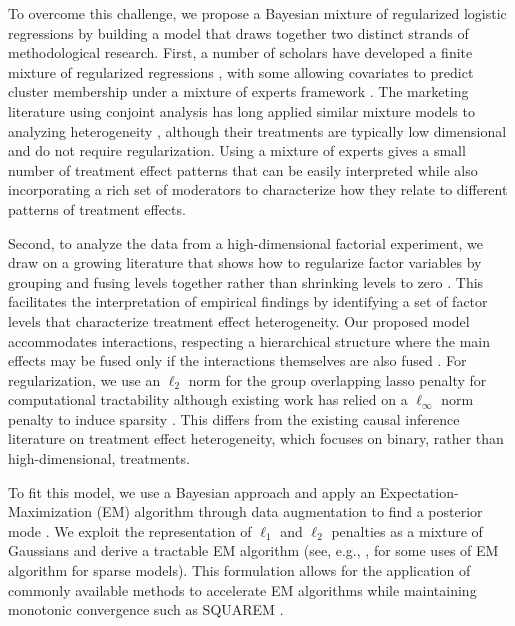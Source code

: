 \documentclass[11pt]{article}
\begin{document}
To overcome this challenge, we propose a Bayesian mixture of
regularized logistic regressions by building a model that draws
together two distinct strands of methodological research.  First, a
number of scholars have developed a finite mixture of regularized
regressions \citep[e.g.,][]{khal:chen:07,stadler2010lasso}, with some
allowing covariates to predict cluster membership under a mixture of
experts framework \citep{khalili2010mixture}. The marketing literature
using conjoint analysis has long applied similar mixture models to
analyzing heterogeneity
\citep[e.g.,][]{gupta1994using,andrews2002empirical}, although their
treatments are typically low dimensional and do not require
regularization. Using a mixture of experts gives a small number of
treatment effect patterns that can be easily interpreted while also
incorporating a rich set of moderators to characterize how they relate
to different patterns of treatment effects.

Second, to analyze the data from a high-dimensional factorial
experiment, we draw on a growing literature that shows how to
regularize factor variables by grouping and fusing levels together
rather than shrinking levels to zero
\citep[e.g.,][]{bondell2009anova,post2013factor,stokell2021modelling}. This
facilitates the interpretation of empirical findings by identifying a
set of factor levels that characterize treatment effect heterogeneity.
Our proposed model accommodates interactions, respecting a
hierarchical structure where the main effects may be fused only if the
interactions themselves are also fused \citep{yan2017hierarchical}.
For regularization, we use an $\ell_2$ norm for the group overlapping
lasso penalty for computational tractability although existing work
has relied on a $\ell_\infty$ norm penalty to induce sparsity
\citep{post2013factor,egam:imai:19}.  This differs from the existing
causal inference literature on treatment effect heterogeneity, which focuses on binary, rather than high-dimensional,
treatments.

To fit this model, we use a Bayesian approach and apply an
Expectation-Maximization (EM) algorithm through data augmentation to
find a posterior mode \citep{demp:lair:rubi:77,meng:vand:97}.  We
exploit the representation of $\ell_1$ and $\ell_2$ penalties as a
mixture of Gaussians and derive a tractable EM algorithm
(see, e.g.,
\citealt{figueiredo2003adaptive,polson2011svm,ratkovic2017sparse,goplerud2021sparsity},
for some uses of EM algorithm for sparse models). This formulation
allows for the application of commonly available methods to accelerate EM algorithms
while maintaining monotonic convergence such as SQUAREM
\citep{varadhan2008simple}. 
\end{document}
